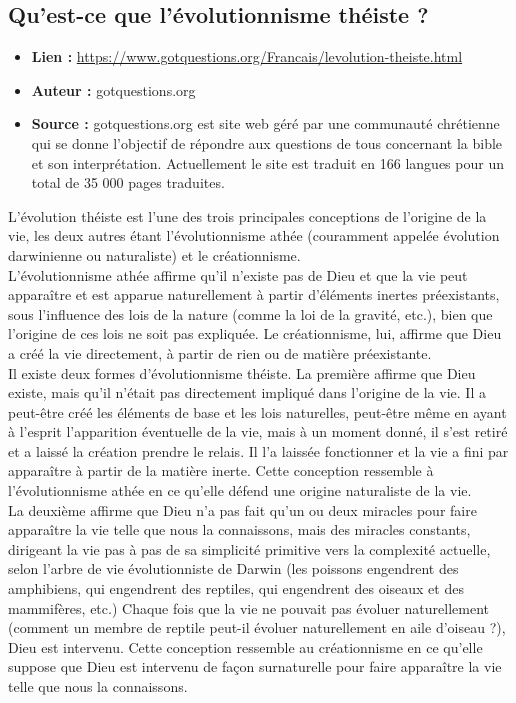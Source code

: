 \documentclass[8pt]{article}
\begin{document}
\newpage

\subsection{Qu’est-ce que l’évolutionnisme théiste ?}
\begin{itemize}
	\item \textbf{Lien : }  \url{https://www.gotquestions.org/Francais/levolution-theiste.html} 
	\item \textbf{Auteur : } gotquestions.org
	\item \textbf{Source : } gotquestions.org est site web géré par une communauté chrétienne qui se donne l'objectif de répondre aux questions de tous concernant la bible et son interprétation. Actuellement le site est traduit en 166 langues pour un total de 35 000 pages traduites.
\end{itemize}

 L’évolution théiste est l’une des trois principales conceptions de l’origine de la vie, les deux autres étant l’évolutionnisme athée (couramment appelée évolution darwinienne ou naturaliste) et le créationnisme.\\
 

L’évolutionnisme athée affirme qu’il n’existe pas de Dieu et que la vie peut apparaître et est apparue naturellement à partir d’éléments inertes préexistants, sous l’influence des lois de la nature (comme la loi de la gravité, etc.), bien que l’origine de ces lois ne soit pas expliquée. Le créationnisme, lui, affirme que Dieu a créé la vie directement, à partir de rien ou de matière préexistante.\\


Il existe deux formes d’évolutionnisme théiste. La première affirme que Dieu existe, mais qu’il n’était pas directement impliqué dans l’origine de la vie. Il a peut-être créé les éléments de base et les lois naturelles, peut-être même en ayant à l’esprit l’apparition éventuelle de la vie, mais à un moment donné, il s’est retiré et a laissé la création prendre le relais. Il l’a laissée fonctionner et la vie a fini par apparaître à partir de la matière inerte. Cette conception ressemble à l’évolutionnisme athée en ce qu’elle défend une origine naturaliste de la vie.\\


La deuxième affirme que Dieu n’a pas fait qu’un ou deux miracles pour faire apparaître la vie telle que nous la connaissons, mais des miracles constants, dirigeant la vie pas à pas de sa simplicité primitive vers la complexité actuelle, selon l’arbre de vie évolutionniste de Darwin (les poissons engendrent des amphibiens, qui engendrent des reptiles, qui engendrent des oiseaux et des mammifères, etc.) Chaque fois que la vie ne pouvait pas évoluer naturellement (comment un membre de reptile peut-il évoluer naturellement en aile d’oiseau ?), Dieu est intervenu. Cette conception ressemble au créationnisme en ce qu’elle suppose que Dieu est intervenu de façon surnaturelle pour faire apparaître la vie telle que nous la connaissons.\\
\end{document}
